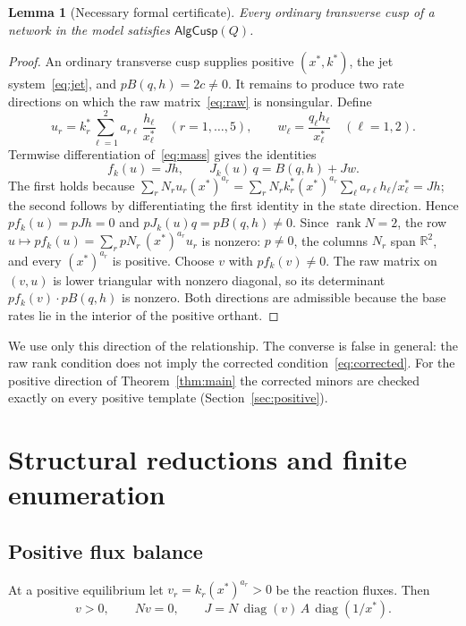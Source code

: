 \documentclass[11pt,a4paper]{article}
\theoremstyle{plain}
\newtheorem{lemma}[theorem]{Lemma}
\theoremstyle{definition}
\theoremstyle{remark}
\numberwithin{equation}{section}
\newcommand{\R}{\mathbb{R}}
\newcommand{\Diag}{\operatorname{diag}}
\newcommand{\rank}{\operatorname{rank}}
\newcommand{\AlgCusp}{\mathsf{AlgCusp}}
\begin{document}
\begin{lemma}[Necessary formal certificate]\label{lem:necessary}
Every ordinary transverse cusp of a network in the model satisfies $\AlgCusp(Q)$.
\end{lemma}
\begin{proof}
An ordinary transverse cusp supplies positive $(x^*,k^*)$, the jet system~\eqref{eq:jet}, and $pB(q,h)=2c\ne0$. It remains to produce two rate directions on which the raw matrix~\eqref{eq:raw} is nonsingular. Define
\[
 u_r=k^*_r\sum_{\ell=1}^2 a_{r\ell}\,\frac{h_\ell}{x^*_\ell}\quad(r=1,\dots,5),\qquad
 w_\ell=\frac{q_\ell h_\ell}{x^*_\ell}\quad(\ell=1,2).
\]
Termwise differentiation of~\eqref{eq:mass} gives the identities
\[
 f_k(u)=Jh,\qquad J_k(u)\,q=B(q,h)+Jw.
\]
The first holds because $\sum_r N_r u_r (x^*)^{a_r}=\sum_r N_rk^*_r(x^*)^{a_r}\sum_\ell a_{r\ell}h_\ell/x^*_\ell=Jh$; the second follows by differentiating the first identity in the state direction. Hence $pf_k(u)=pJh=0$ and $pJ_k(u)q=pB(q,h)\ne0$. Since $\rank N=2$, the row $u\mapsto pf_k(u)=\sum_r pN_r\,(x^*)^{a_r}u_r$ is nonzero: $p\ne0$, the columns $N_r$ span $\R^2$, and every $(x^*)^{a_r}$ is positive. Choose $v$ with $pf_k(v)\ne0$. The raw matrix on $(v,u)$ is lower triangular with nonzero diagonal, so its determinant $pf_k(v)\cdot pB(q,h)$ is nonzero. Both directions are admissible because the base rates lie in the interior of the positive orthant.
\end{proof}

We use only this direction of the relationship. The converse is false in general: the raw rank condition does not imply the corrected condition~\eqref{eq:corrected}. For the positive direction of Theorem~\ref{thm:main} the corrected minors are checked exactly on every positive template (Section~\ref{sec:positive}).

\section{Structural reductions and finite enumeration}\label{sec:reductions}

\subsection{Positive flux balance}
At a positive equilibrium let $v_r=k_r(x^*)^{a_r}>0$ be the reaction fluxes. Then
\begin{equation}\label{eq:flux}
 v>0,\qquad Nv=0,\qquad J=N\,\Diag(v)\,A\,\Diag(1/x^*).
\end{equation}
\end{document}
